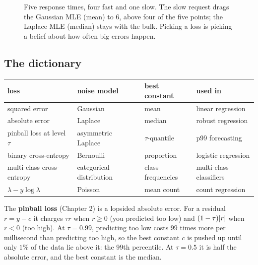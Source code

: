 \begin{figure}[H]
\centering
{}
\caption{Five response times, four fast and one slow. The slow request drags the Gaussian
MLE (mean) to $6$, above four of the five points; the Laplace MLE (median) stays with the
bulk. Picking a loss is picking a belief about how often big errors happen.}
\label{fig:lik-mean-median}
\end{figure}

\subsection{The dictionary}

\begin{center}
\begin{tabular}{llll}
\toprule
loss & noise model & best constant & used in \\
\midrule
squared error & Gaussian & mean & linear regression \\
absolute error & Laplace & median & robust regression \\
pinball loss at level $\tau$ & asymmetric Laplace & $\tau$-quantile & p99 forecasting \\
binary cross-entropy & Bernoulli & proportion & logistic regression \\
multi-class cross-entropy & categorical distribution & class frequencies & multi-class classifiers \\
$\lambda - y\log\lambda$ & Poisson & mean count & count regression \\
\bottomrule
\end{tabular}
\end{center}

The \textbf{pinball loss} (Chapter 2) is a lopsided absolute error. For a residual
$r = y - c$ it charges $\tau r$ when $r \ge 0$ (you predicted too low) and $(1-\tau)\lvert r\rvert$
when $r<0$ (too high). At $\tau = 0.99$, predicting too low costs $99$ times more per
millisecond than predicting too high, so the best constant $c$ is pushed up until only
$1\%$ of the data lie above it: the 99th percentile. At $\tau = 0.5$ it is half the
absolute error, and the best constant is the median.

